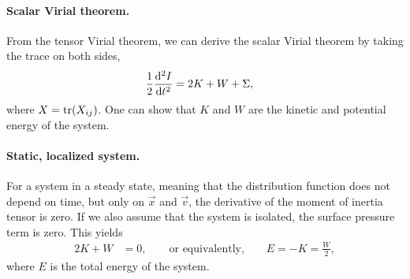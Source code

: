 \paragraph*{Scalar Virial theorem.}
From the tensor Virial theorem, we can derive the scalar Virial theorem by taking the trace on both sides,
\begin{align*}
	\frac{1}{2} \dv[2]{I}{t}
	&= 2 K + W + \Sigma,
\end{align*}
where $X = \tr(X_{ij})$. One can show that $K$ and $W$ are the kinetic and potential energy of the system.

\paragraph*{Static, localized system.}
For a system in a steady state, meaning that the distribution function does not depend on time, but only on $\vec{x}$ and $\vec{v}$, the derivative of the moment of inertia tensor is zero. If we also assume that the system is isolated, the surface pressure term is zero. This yields
\begin{align*}
	2 K + W &= 0,
	\qquad \text{or equivalently,} \qquad
	E = - K = \frac{W}{2},
\end{align*}
where $E$ is the total energy of the system.




